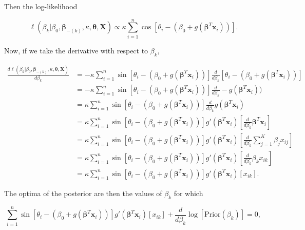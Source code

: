 \documentclass{article}\usepackage[]{graphicx}\usepackage[]{color}
\begin{document}
Then the log-likelihood

\begin{equation*}
\ell(\beta_{k} \vert \beta_0, \boldsymbol\beta_{-(k)}, \kappa, \boldsymbol\theta, \boldsymbol{X})  \propto \kappa \sum_{i=1}^{n} \cos \left[ \theta_i - (\beta_0 + g(\boldsymbol\beta^T \boldsymbol{x}_i)) \right].
\end{equation*}

Now, if we take the derivative with respect to $\beta_k,$

\begin{align*}
\frac{d\ell(\beta_{k} \vert \beta_0, \boldsymbol\beta_{-(k)}, \kappa, \boldsymbol\theta, \boldsymbol{X})}{d\beta_k}
& = - \kappa \sum_{i=1}^{n} \sin \left[ \theta_i - (\beta_0 + g(\boldsymbol\beta^T \boldsymbol{x}_i)) \right] \frac{d}{d\beta_k} \left[ \theta_i - (\beta_0 + g(\boldsymbol\beta^T \boldsymbol{x}_i)) \right] \\
& = -\kappa \sum_{i=1}^{n} \sin \left[ \theta_i - (\beta_0 + g(\boldsymbol\beta^T \boldsymbol{x}_i)) \right] \frac{d}{d\beta_k} - g(\boldsymbol\beta^T \boldsymbol{x}_i)) \\
& = \kappa \sum_{i=1}^{n} \sin \left[ \theta_i - (\beta_0 + g(\boldsymbol\beta^T \boldsymbol{x}_i)) \right] \frac{d}{d\beta_k} g(\boldsymbol\beta^T \boldsymbol{x}_i) \\
& = \kappa \sum_{i=1}^{n} \sin \left[ \theta_i - (\beta_0 + g(\boldsymbol\beta^T \boldsymbol{x}_i)) \right] g'(\boldsymbol\beta^T \boldsymbol{x}_i) \left[  \frac{d}{d\beta_k} \boldsymbol\beta^T \boldsymbol{x}_i \right] \\
& = \kappa \sum_{i=1}^{n} \sin \left[ \theta_i - (\beta_0 + g(\boldsymbol\beta^T \boldsymbol{x}_i)) \right] g'(\boldsymbol\beta^T \boldsymbol{x}_i) \left[ \frac{d}{d\beta_k} \sum_{j=1}^K \beta_j x_{ij} \right] \\
& = \kappa \sum_{i=1}^{n} \sin \left[ \theta_i - (\beta_0 + g(\boldsymbol\beta^T \boldsymbol{x}_i)) \right] g'(\boldsymbol\beta^T \boldsymbol{x}_i) \left[ \frac{d}{d\beta_k}  \beta_k x_{ik} \right] \\
& = \kappa \sum_{i=1}^{n} \sin \left[ \theta_i - (\beta_0 + g(\boldsymbol\beta^T \boldsymbol{x}_i)) \right] g'(\boldsymbol\beta^T \boldsymbol{x}_i) \left[ x_{ik} \right].
\end{align*}

The optima of the posterior are then the values of $\beta_k$ for which

$$ \sum_{i=1}^{n} \sin \left[ \theta_i - (\beta_0 + g(\boldsymbol\beta^T \boldsymbol{x}_i)) \right] g'(\boldsymbol\beta^T \boldsymbol{x}_i) \left[ x_{ik} \right] + \frac{d}{d\beta_k} \log \left[ \text{Prior}(\beta_k) \right] = 0, $$
\end{document}
